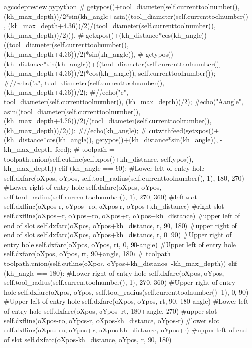 \documentclass{ltxdoc}
\begin{document}
\begin{writecode}{a}{gcodepreview.py}{python}
{# getypos()+tool_diameter(self.currenttoolnumber(), (kh_max_depth))/2*sin(kh_angle+asin((tool_diameter(self.currenttoolnumber(), (kh_max_depth+4.36))/2)/(tool_diameter(self.currenttoolnumber(), (kh_max_depth))/2))), 
# getxpos()+(kh_distance*cos(kh_angle))-((tool_diameter(self.currenttoolnumber(), (kh_max_depth+4.36))/2)*sin(kh_angle)), 
# getypos()+(kh_distance*sin(kh_angle))+((tool_diameter(self.currenttoolnumber(), (kh_max_depth+4.36))/2)*cos(kh_angle)), self.currenttoolnumber());
#//echo("a", tool_diameter(self.currenttoolnumber(), (kh_max_depth+4.36))/2);
#//echo("c", tool_diameter(self.currenttoolnumber(), (kh_max_depth))/2);
#echo("Aangle", asin((tool_diameter(self.currenttoolnumber(), (kh_max_depth+4.36))/2)/(tool_diameter(self.currenttoolnumber(), (kh_max_depth))/2)));
#//echo(kh_angle);
# cutwithfeed(getxpos()+(kh_distance*cos(kh_angle)), getypos()+(kh_distance*sin(kh_angle)), -kh_max_depth, feed);
#            toolpath = toolpath.union(self.cutline(self.xpos()+kh_distance, self.ypos(), -kh_max_depth))
        elif (kh_angle == 90):
#Lower left of entry hole
            self.dxfarc(oXpos, oYpos, self.tool_radius(self.currenttoolnumber(), 1), 180, 270)
#Lower right of entry hole
            self.dxfarc(oXpos, oYpos, self.tool_radius(self.currenttoolnumber(), 1), 270, 360)
#left slot
            self.dxfline(oXpos-r, oYpos+ro, oXpos-r, oYpos+kh_distance)
#right slot
            self.dxfline(oXpos+r, oYpos+ro, oXpos+r, oYpos+kh_distance)
#upper left of end of slot
            self.dxfarc(oXpos, oYpos+kh_distance, r, 90, 180)
#upper right of end of slot
            self.dxfarc(oXpos, oYpos+kh_distance, r, 0, 90)
#Upper right of entry hole
            self.dxfarc(oXpos, oYpos, rt, 0, 90-angle)
#Upper left of entry hole
            self.dxfarc(oXpos, oYpos, rt, 90+angle, 180)
#            toolpath = toolpath.union(self.cutline(oXpos, oYpos+kh_distance, -kh_max_depth))
        elif (kh_angle == 180):
#Lower right of entry hole
            self.dxfarc(oXpos, oYpos, self.tool_radius(self.currenttoolnumber(), 1), 270, 360)
#Upper right of entry hole
            self.dxfarc(oXpos, oYpos, self.tool_radius(self.currenttoolnumber(), 1), 0, 90)
#Upper left of entry hole
            self.dxfarc(oXpos, oYpos, rt, 90, 180-angle)
#Lower left of entry hole
            self.dxfarc(oXpos, oYpos, rt, 180+angle, 270)
#upper slot
            self.dxfline(oXpos-ro, oYpos-r, oXpos-kh_distance, oYpos-r)
#lower slot
            self.dxfline(oXpos-ro, oYpos+r, oXpos-kh_distance, oYpos+r)
#upper left of end of slot
            self.dxfarc(oXpos-kh_distance, oYpos, r, 90, 180)
}
\end{writecode}
\end{document}
